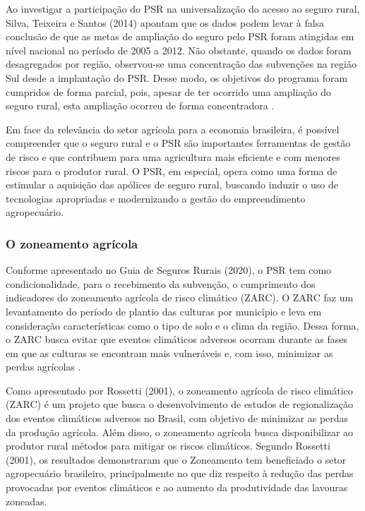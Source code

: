 \documentclass[12pt,a4paper]{article}
\begin{document}
Ao investigar a participação do PSR na universalização do acesso ao seguro rural, Silva, Teixeira e Santos (2014) apontam que os dados podem levar à falsa conclusão de que as metas de ampliação do seguro pelo PSR foram atingidas em nível nacional no período de 2005 a 2012. Não obstante, quando os dados foram desagregados por região, observou-se uma concentração das subvenções na região Sul desde a implantação do PSR. Desse modo, os objetivos do programa foram cumpridos de forma parcial, pois, apesar de ter ocorrido uma ampliação do seguro rural, esta ampliação ocorreu de forma concentradora \cite{silva14}. 

Em face da relevância do setor agrícola para a economia brasileira, é possível compreender que o seguro rural e o PSR são importantes ferramentas de gestão de risco e que contribuem para uma agricultura mais eficiente e com menores riscos para o produtor rural. O PSR, em especial, opera como uma forma de estimular a aquisição das apólices de seguro rural, buscando induzir o uso de tecnologias apropriadas e modernizando a gestão do empreendimento agropecuário. 

\subsubsection{O zoneamento agrícola}

Conforme apresentado no Guia de Seguros Rurais (2020), o PSR tem como condicionalidade, para o recebimento da subvenção, o cumprimento dos indicadores do zoneamento agrícola de risco climático (ZARC). O ZARC faz um levantamento do período de plantio das culturas por município e leva em consideração características como o tipo de solo e o clima da região. Dessa forma, o ZARC busca evitar que eventos climáticos adversos ocorram durante as fases em que as culturas se encontram mais vulneráveis e, com isso, minimizar as perdas agrícolas \cite{guia_20}.

Como apresentado por Rossetti (2001), o  zoneamento agrícola de risco climático (ZARC) é um projeto que busca o desenvolvimento de estudos de regionalização dos eventos climáticos adversos no Brasil, com objetivo de minimizar as perdas da produção agrícola. Além disso, o zoneamento agrícola busca disponibilizar ao produtor rural métodos para mitigar os riscos climáticos. Segundo Rossetti (2001), os resultados demonstraram que o Zoneamento tem beneficiado o setor agropecuário brasileiro, principalmente no que diz respeito à redução das perdas provocadas por eventos climáticos e ao aumento da produtividade das lavouras zoneadas.
\end{document}
